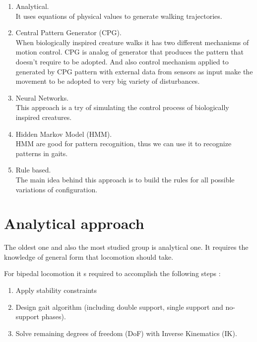 \documentclass[12pt,a4paper]{report}
\begin{document}
		\begin{enumerate}
			\item Analytical.\\ It uses equations of physical values to generate walking trajectories.
			\item Central Pattern Generator (CPG).\\ When biologically inspired creature walks it has two different mechanisms of motion control. CPG is analog of generator that produces the pattern that doesn't require to be adopted. And also control mechanism applied to generated by CPG pattern with external data from sensors as input make the movement to be adopted to very big variety of disturbances.
			\item Neural Networks.\\ This approach is a try of simulating the control process of biologically inspired creatures.
			\item Hidden Markov Model (HMM).\\ HMM are good for pattern recognition, thus we can use it to recognize patterns in gaits.
			\item Rule based.\\ The main idea behind this approach is to build the rules for all possible variations of configuration.
		\end{enumerate}

		\section{Analytical approach}
		The oldest one and also the most studied group is analytical one. It requires the knowledge of general form that locomotion should take.

		For bipedal locomotion it s required to accomplish the following steps \cite{wright2014intelligent}:
		\begin{enumerate}
			\item Apply stability constraints
			\item Design gait algorithm (including double support, single support and no-support phases).
			\item Solve remaining degrees of freedom (DoF) with Inverse Kinematics (IK).
		\end{enumerate}
\end{document}
